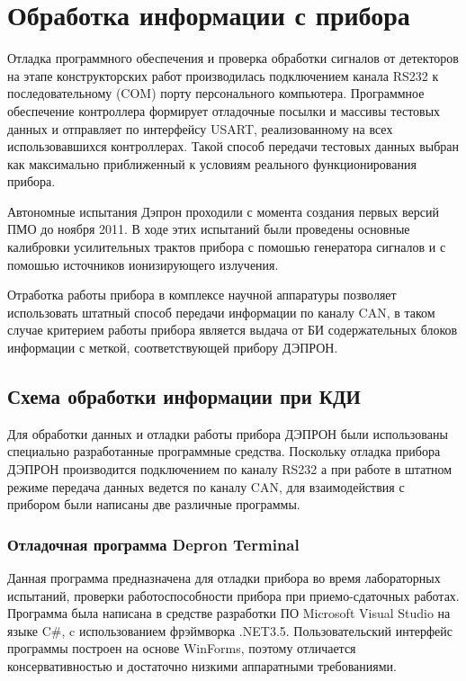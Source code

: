 \chapter{Обработка информации с прибора} \label{chapt3}


Отладка программного обеспечения и проверка обработки сигналов от детекторов на этапе  конструкторских работ производилась подключением канала RS232 к последовательному (COM) порту персонального компьютера. Программное обеспечение контроллера формирует отладочные посылки и массивы тестовых данных и отправляет по интерфейсу USART, реализованному на всех использовавшихся контроллерах. Такой способ передачи тестовых данных выбран как максимально приближенный к условиям реального функционирования прибора. 

Автономные испытания Дэпрон проходили с момента создания первых версий ПМО до ноября 2011. В ходе этих испытаний были проведены основные калибровки усилительных трактов прибора с помошью генератора сигналов и с помошью  источников ионизирующего излучения.

Отработка работы прибора в комплексе научной аппаратуры позволяет использовать штатный способ передачи информации по каналу CAN, в таком случае критерием работы прибора является выдача от БИ содержательных блоков информации с меткой, соответствующей прибору ДЭПРОН. 

\section{Схема обработки информации при КДИ}\label{sec3.1}

Для обработки данных и отладки работы прибора ДЭПРОН были использованы специально разработанные программные средства. Поскольку отладка прибора ДЭПРОН производится подключением по каналу RS232 а при работе в штатном режиме передача данных ведется по каналу CAN, для взаимодействия с прибором были написаны две различные программы.

\subsection{Отладочная программа Depron Terminal}

Данная программа предназначена для отладки прибора во время лабораторных испытаний, проверки работоспособности прибора при приемо-сдаточных работах. Программа была написана в средстве разработки ПО Microsoft Visual Studio на языке C\#, c использованием фрэймворка .NET3.5. Пользовательский интерфейс программы построен на основе WinForms, поэтому отличается консервативностью и достаточно низкими аппаратными требованиями.

